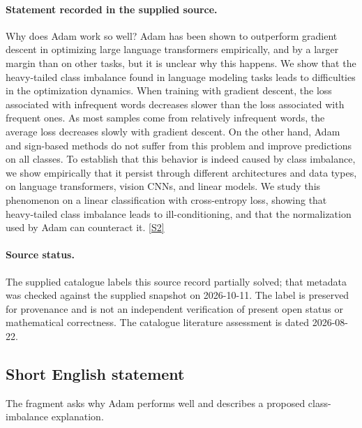 \documentclass[11pt]{article}
\newcommand{\sref}[2]{\hyperlink{source:#1:#2}{[S#2]}}
\begin{document}
\paragraph{Statement recorded in the supplied source.}
Why does Adam work so well? Adam has been shown to outperform gradient descent in optimizing large language transformers empirically, and by a larger margin than on other tasks, but it is unclear why this happens. We show that the heavy-tailed class imbalance found in language modeling tasks leads to difficulties in the optimization dynamics. When training with gradient descent, the loss associated with infrequent words decreases slower than the loss associated with frequent ones. As most samples come from relatively infrequent words, the average loss decreases slowly with gradient descent. On the other hand, Adam and sign-based methods do not suffer from this problem and improve predictions on all classes. To establish that this behavior is indeed caused by class imbalance, we show empirically that it persist through different architectures and data types, on language transformers, vision CNNs, and linear models. We study this phenomenon on a linear classification with cross-entropy loss, showing that heavy-tailed class imbalance leads to ill-conditioning, and that the normalization used by Adam can counteract it. \sref{statement}{2}
\paragraph{Source status.}
The supplied catalogue labels this source record partially solved; that metadata was checked against the supplied snapshot on 2026-10-11. The label is preserved for provenance and is not an independent verification of present open status or mathematical correctness. The catalogue literature assessment is dated 2026-08-22.
\subsection{Short English statement}
The fragment asks why Adam performs well and describes a proposed class-imbalance explanation.
\end{document}
